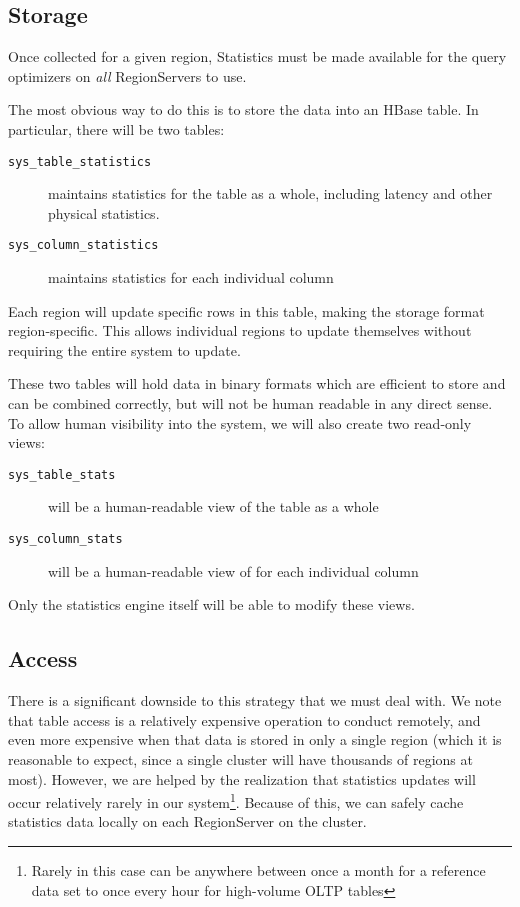 \subsection{Storage}
Once collected for a given region, Statistics must be made available for the query optimizers on \emph{all} RegionServers to use. 

The most obvious way to do this is to store the data into an HBase table. In particular, there will be two tables: 

\begin{description}
				\item[\texttt{sys\_table\_statistics}] maintains statistics for the table as a whole, including latency and other physical statistics.
				\item[\texttt{sys\_column\_statistics}] maintains statistics for each individual column
\end{description}

Each region will update specific rows in this table, making the storage format region-specific. This allows individual regions to update themselves without requiring the entire system to update.

These two tables will hold data in binary formats which are efficient to store and can be combined correctly, but will not be human readable in any direct sense. To allow human visibility into the system, we will also create two read-only views:

\begin{description}
				\item[\texttt{sys\_table\_stats}] will be a human-readable view of the table as a whole
				\item[\texttt{sys\_column\_stats}] will be a human-readable view of for each individual column
\end{description}

Only the statistics engine itself will be able to modify these views.

\subsection{Access}
There is a significant downside to this strategy that we must deal with. We note that table access is a relatively expensive operation to conduct remotely, and even more expensive when that data is stored in only a single region (which it is reasonable to expect, since a single cluster will have thousands of regions at most). However, we are helped by the realization that statistics updates will occur relatively rarely in our system\footnote{Rarely in this case can be anywhere between once a month for a reference data set to once every hour for high-volume OLTP tables}. Because of this, we can safely cache statistics data locally on each RegionServer on the cluster.

